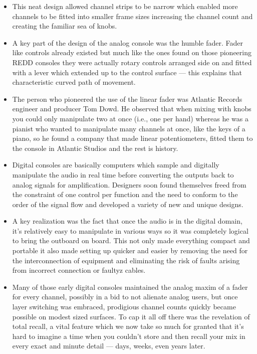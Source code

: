 \documentclass[12pt]{article}
\begin{document}
\begin{itemize}
            \item This neat design allowed channel strips to be narrow which enabled more channels to be fitted into smaller frame sizes increasing the channel count and creating the familiar sea of knobs.
            \item A key part of the design of the analog console was the humble fader. Fader like controls already existed but much like the ones found on those pioneering REDD consoles they were actually rotary controls arranged side on and fitted with a lever which extended up to the control surface --- this explains that characteristic curved path of movement.
            \item The person who pioneered the use of the linear fader was Atlantic Records engineer and producer Tom Dowd. He observed that when mixing with knobs you could only manipulate two at once (i.e., one per hand) whereas he was a pianist who wanted to manipulate many channels at once, like the keys of a piano, so he found a company that made linear potentiometers, fitted them to the console in Atlantic Studios and the rest is history.
            \item Digital consoles are basically computers which sample and digitally manipulate the audio in real time before converting the outputs back to analog signals for amplification. Designers soon found themselves freed from the constraint of one control per function and the need to conform to the order of the signal flow and developed a variety of new and unique designs.
            \item A key realization was the fact that once the audio is in the digital domain, it's relatively easy to manipulate in various ways so it was completely logical to bring the outboard on board. This not only made everything compact and portable it also made setting up quicker and easier by removing the need for the interconnection of equipment and eliminating the risk of faults arising from incorrect connection or faultyz cables.
            \item Many of those early digital consoles maintained the analog maxim of a fader for every channel, possibly in a bid to not alienate analog users, but once layer switching was embraced, prodigious channel counts quickly became possible on modest sized surfaces. To cap it all off there was the revelation of total recall, a vital feature which we now take so much for granted that it's hard to imagine a time when you couldn't store and then recall your mix in every exact and minute detail --- days, weeks, even years later.

\end{itemize}
\end{document}
